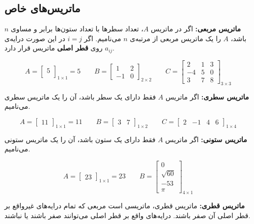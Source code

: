 \subsection{ماتریس‌های خاص}
\textbf{ماتریس مربعی:}
اگر در ماتریس $A$، تعداد سطرها با تعداد ستون‌ها برابر و مساوی $n$ باشد، $A$ را یک ماتریس مربعی از مرتبه‌ی $n$ می‌نامیم. اگر
$i=j$
در این صورت درایه‌ی
$a_{ij}$
روی
\textbf{قطر اصلی}
ماتریس قرار دارد.
\begin{example}
	\[
	A = \begin{bmatrix}
		5 \\
	\end{bmatrix}_{1 \times 1}
	= 5
	\qquad
	B = \begin{bmatrix}
		1 & 2 \\
		-1 & 0
	\end{bmatrix}_{2 \times 2}
	\qquad
	C = \begin{bmatrix}
		2 & 1 & 3 \\
		-4 & 5 & 0 \\
		3 & 7 & 8
	\end{bmatrix}_{3 \times 3}
	\]
\end{example}
\smallskip
\textbf{ماتریس سطری:}
اگر ماتریس $A$ فقط دارای یک سطر باشد، آن را یک ماتریس سطری می‌نامیم.
\begin{example}
	\[
	A = \begin{bmatrix}
		11
	\end{bmatrix}_{1 \times 1}
	=11
	\qquad
	B = \begin{bmatrix}
		3 & 7
	\end{bmatrix}_{1 \times 2}
	\qquad
	C = \begin{bmatrix}
		2 & -1 & 4 & 6
	\end{bmatrix}_{1 \times 4}
	\]
\end{example}
\smallskip
\textbf{ماتریس ستونی:}
اگر ماتریس $A$ فقط دارای یک ستون باشد، آن را یک ماتریس ستونی می‌نامیم.
\begin{example}
	\[
	A = \begin{bmatrix}
		23
	\end{bmatrix}_{1 \times 1}
	=23
	\qquad
	B = \begin{bmatrix}
		0 \\
		\sqrt{60} \\
		-53 \\
		\pi
	\end{bmatrix}_{4 \times 1}
	\]
\end{example}
\smallskip
\textbf{ماتریس قطری:}
ماتریس قطری، ماتریسی است مربعی که تمام درایه‌های غیرواقع بر قطر اصلی آن صفر باشند. درایه‌های واقع بر قطر اصلی می‌توانند صفر باشند یا نباشند.
